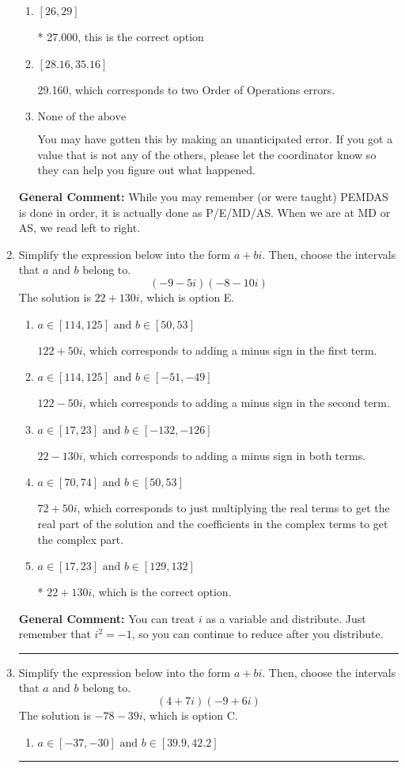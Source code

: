 \documentclass{extbook}[14pt]
\newcommand{\litem}[1]{\item #1

\rule{\textwidth}{0.4pt}}
\begin{document}
\begin{enumerate}
{\begin{enumerate}[label=\Alph*.]
 45.000, which corresponds to an Order of Operations error: multiplying by negative before squaring. For example: $(-3)^2 \neq -3^2$
\item \( [26, 29] \)

* 27.000, this is the correct option
\item \( [28.16, 35.16] \)

 29.160, which corresponds to two Order of Operations errors.
\item \( \text{None of the above} \)

 You may have gotten this by making an unanticipated error. If you got a value that is not any of the others, please let the coordinator know so they can help you figure out what happened.
\end{enumerate}

\textbf{General Comment:} While you may remember (or were taught) PEMDAS is done in order, it is actually done as P/E/MD/AS. When we are at MD or AS, we read left to right.
}
\litem{
Simplify the expression below into the form $a+bi$. Then, choose the intervals that $a$ and $b$ belong to.
\[ (-9 - 5 i)(-8 - 10 i) \]The solution is \( 22 + 130 i \), which is option E.\begin{enumerate}[label=\Alph*.]
\item \( a \in [114, 125] \text{ and } b \in [50, 53] \)

 $122 + 50 i$, which corresponds to adding a minus sign in the first term.
\item \( a \in [114, 125] \text{ and } b \in [-51, -49] \)

 $122 - 50 i$, which corresponds to adding a minus sign in the second term.
\item \( a \in [17, 23] \text{ and } b \in [-132, -126] \)

 $22 - 130 i$, which corresponds to adding a minus sign in both terms.
\item \( a \in [70, 74] \text{ and } b \in [50, 53] \)

 $72 + 50 i$, which corresponds to just multiplying the real terms to get the real part of the solution and the coefficients in the complex terms to get the complex part.
\item \( a \in [17, 23] \text{ and } b \in [129, 132] \)

* $22 + 130 i$, which is the correct option.
\end{enumerate}

\textbf{General Comment:} You can treat $i$ as a variable and distribute. Just remember that $i^2=-1$, so you can continue to reduce after you distribute.
}
\litem{
Simplify the expression below into the form $a+bi$. Then, choose the intervals that $a$ and $b$ belong to.
\[ (4 + 7 i)(-9 + 6 i) \]The solution is \( -78 - 39 i \), which is option C.\begin{enumerate}[label=\Alph*.]
\item \( a \in [-37, -30] \text{ and } b \in [39.9, 42.2] \)


\end{enumerate}}
\end{enumerate}
\end{document}
